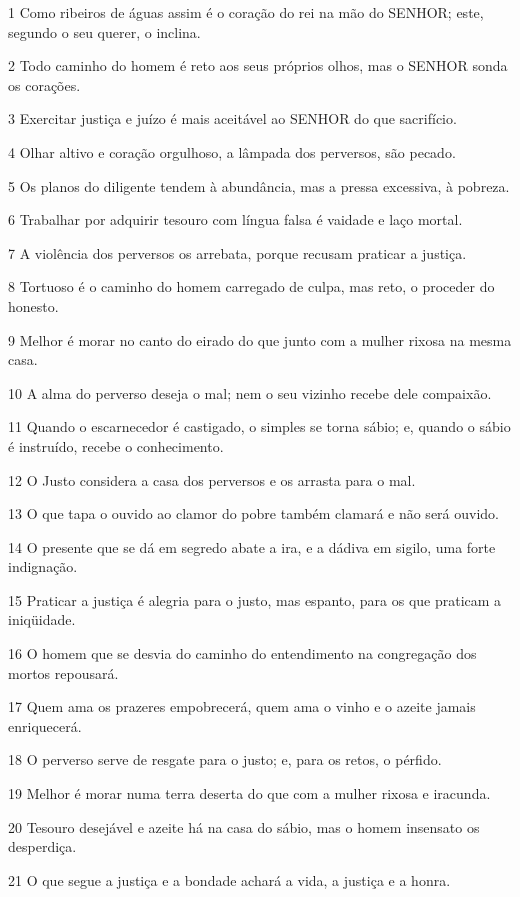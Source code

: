 \par 1 Como ribeiros de águas assim é o coração do rei na mão do SENHOR; este, segundo o seu querer, o inclina.
\par 2 Todo caminho do homem é reto aos seus próprios olhos, mas o SENHOR sonda os corações.
\par 3 Exercitar justiça e juízo é mais aceitável ao SENHOR do que sacrifício.
\par 4 Olhar altivo e coração orgulhoso, a lâmpada dos perversos, são pecado.
\par 5 Os planos do diligente tendem à abundância, mas a pressa excessiva, à pobreza.
\par 6 Trabalhar por adquirir tesouro com língua falsa é vaidade e laço mortal.
\par 7 A violência dos perversos os arrebata, porque recusam praticar a justiça.
\par 8 Tortuoso é o caminho do homem carregado de culpa, mas reto, o proceder do honesto.
\par 9 Melhor é morar no canto do eirado do que junto com a mulher rixosa na mesma casa.
\par 10 A alma do perverso deseja o mal; nem o seu vizinho recebe dele compaixão.
\par 11 Quando o escarnecedor é castigado, o simples se torna sábio; e, quando o sábio é instruído, recebe o conhecimento.
\par 12 O Justo considera a casa dos perversos e os arrasta para o mal.
\par 13 O que tapa o ouvido ao clamor do pobre também clamará e não será ouvido.
\par 14 O presente que se dá em segredo abate a ira, e a dádiva em sigilo, uma forte indignação.
\par 15 Praticar a justiça é alegria para o justo, mas espanto, para os que praticam a iniqüidade.
\par 16 O homem que se desvia do caminho do entendimento na congregação dos mortos repousará.
\par 17 Quem ama os prazeres empobrecerá, quem ama o vinho e o azeite jamais enriquecerá.
\par 18 O perverso serve de resgate para o justo; e, para os retos, o pérfido.
\par 19 Melhor é morar numa terra deserta do que com a mulher rixosa e iracunda.
\par 20 Tesouro desejável e azeite há na casa do sábio, mas o homem insensato os desperdiça.
\par 21 O que segue a justiça e a bondade achará a vida, a justiça e a honra.
